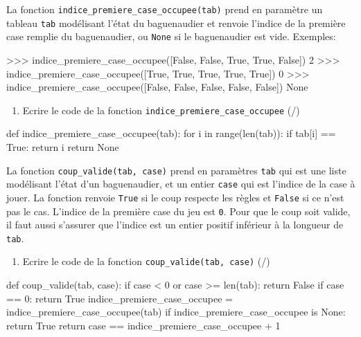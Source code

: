\medskip

 La fonction \verb|indice_premiere_case_occupee(tab)| prend en paramètre un tableau \texttt{tab} modélisant l'état du baguenaudier et renvoie l'indice de la première case remplie du baguenaudier, ou \texttt{None} si le baguenaudier est vide. Exemples:

    \begin{CodePythontexAlt}[TaillePolice=\large, Largeur=1\linewidth,Centre,Lignes=true,PremLigne=1]{}
>>> indice_premiere_case_occupee([False, False, True, True, False])
2
>>> indice_premiere_case_occupee([True, True, True, True, True])
0
>>> indice_premiere_case_occupee([False, False, False, False, False])
None
    \end{CodePythontexAlt}

    \begin{enumerate}[resume=monDS]
\item Ecrire le code de la fonction \verb|indice_premiere_case_occupee| (/)
\end{enumerate}

\begin{blocvisible}[height=6]
    \begin{CodePythontexAlt}[TaillePolice=\large, Largeur=1\linewidth,Centre,Lignes=true,PremLigne=1]{}
    def indice_premiere_case_occupee(tab):
        for i in range(len(tab)):
            if tab[i] == True:
                return i
        return None
    \end{CodePythontexAlt}
\end{blocvisible}

\pagebreak


 La fonction \verb|coup_valide(tab, case)| prend en paramètres \texttt{tab} qui est une liste modélisant l'état d'un baguenaudier, et un entier \texttt{case} qui est l'indice de la case à jouer. La fonction renvoie \texttt{True} si le coup respecte les règles et \texttt{False} si ce n'est pas le cas. L'indice de la première case du jeu est \texttt{0}. Pour que le coup soit valide, il faut aussi s'assurer que l'indice est un entier positif inférieur à la longueur de \texttt{tab}.


 \begin{enumerate}[resume=monDS]
\item Ecrire le code de la fonction \verb|coup_valide(tab, case)|  (/)
\end{enumerate}

\begin{blocvisible}[height=6]
    \begin{CodePythontexAlt}[TaillePolice=\large, Largeur=1\linewidth,Centre,Lignes=true,PremLigne=1]{}
    def coup_valide(tab, case):
        if case < 0 or case >= len(tab):
            return False
        if case == 0:
            return True
        indice_premiere_case_occupee = indice_premiere_case_occupee(tab)
        if indice_premiere_case_occupee is None:
            return True
        return case == indice_premiere_case_occupee + 1
    \end{CodePythontexAlt}
\end{blocvisible}

